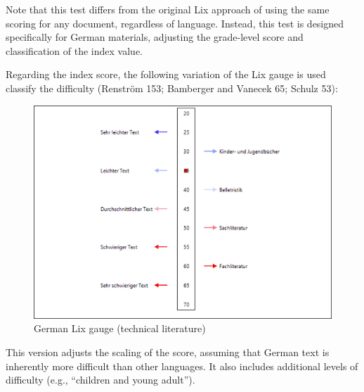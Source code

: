 \documentclass[
]{book}
\theoremstyle{definition}
\theoremstyle{definition}
\theoremstyle{definition}
\theoremstyle{definition}
\theoremstyle{remark}
\begin{document}
Note that this test differs from the original Lix approach of using the same scoring for any document, regardless of language. Instead, this test is designed specifically for German materials, adjusting the grade-level score and classification of the index value.

Regarding the index score, the following variation of the Lix gauge is used classify the difficulty (Renström 153; Bamberger and Vanecek 65; Schulz 53):

\begin{figure}[H]

{\centering \includegraphics[width=0.75\linewidth,]{Images/GermanLixGauge} 

}

\caption{German Lix gauge (technical literature)}\label{fig:germanLix2}
\end{figure}

This version adjusts the scaling of the score, assuming that German text is inherently more difficult than other languages. It also includes additional levels of difficulty (e.g., ``children and young adult'').
\end{document}
